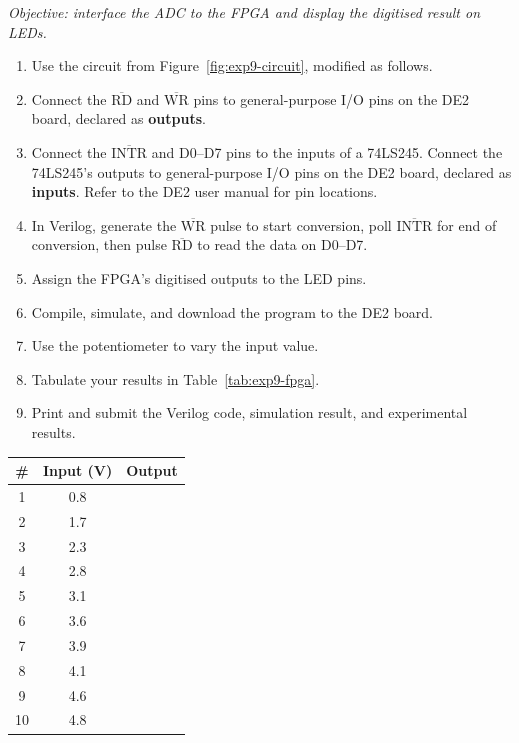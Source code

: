 \begin{procedure}
  \textit{Objective: interface the ADC to the FPGA and display the digitised result on LEDs.}

  \begin{enumerate}
    \item Use the circuit from Figure~\ref{fig:exp9-circuit}, modified as follows.
    \item Connect the $\overline{\text{RD}}$ and $\overline{\text{WR}}$ pins to general-purpose I/O pins on the DE2 board, declared as \textbf{outputs}.
    \item Connect the $\overline{\text{INTR}}$ and D0--D7 pins to the inputs of a 74LS245. Connect the 74LS245's outputs to general-purpose I/O pins on the DE2 board, declared as \textbf{inputs}. Refer to the DE2 user manual for pin locations.
    \item In Verilog, generate the $\overline{\text{WR}}$ pulse to start conversion, poll $\overline{\text{INTR}}$ for end of conversion, then pulse $\overline{\text{RD}}$ to read the data on D0--D7.
    \item Assign the FPGA's digitised outputs to the LED pins.
    \item Compile, simulate, and download the program to the DE2 board.
    \item Use the potentiometer to vary the input value.
    \item Tabulate your results in Table~\ref{tab:exp9-fpga}.
    \item Print and submit the Verilog code, simulation result, and experimental results.
  \end{enumerate}

  \needspace{4cm}
  \begin{boxedtable}
    \label{tab:exp9-fpga}
    {\renewcommand{\arraystretch}{1.5}
      \centering
      \begin{tabular}{cc c}
        \toprule
        \# & Input (V) & Output \\
        \midrule
        1  & 0.8       &        \\
        2  & 1.7       &        \\
        3  & 2.3       &        \\
        4  & 2.8       &        \\
        5  & 3.1       &        \\
        6  & 3.6       &        \\
        7  & 3.9       &        \\
        8  & 4.1       &        \\
        9  & 4.6       &        \\
        10 & 4.8       &        \\
        \bottomrule
      \end{tabular}
    }
  \end{boxedtable}
  \vspace*{1.5em}


\end{procedure}
